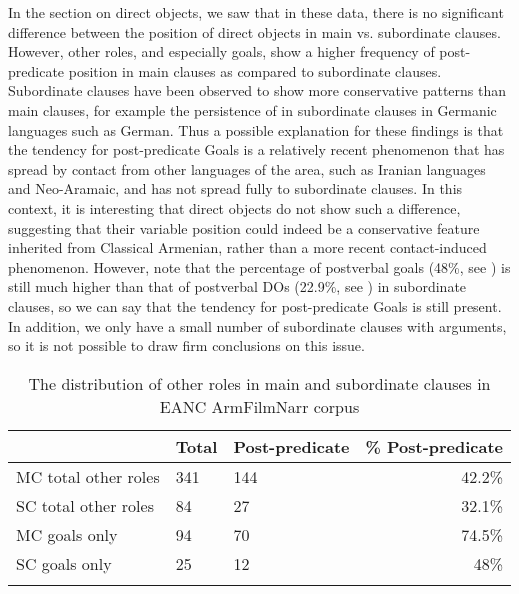 \documentclass[output=paper,colorlinks,citecolor=brown,draftmode]{langscibook}
\begin{document}
 In the section on direct objects, we saw that in these data, there is no significant difference between the position of direct objects in main vs. subordinate clauses. However, other roles, and especially goals, show a higher frequency of post-predicate position in main clauses as compared to subordinate clauses. Subordinate clauses have been observed to show more conservative  patterns than main clauses, for example the persistence of  in subordinate clauses in Germanic languages such as German. Thus a possible explanation for these findings is that the tendency for post-predicate Goals is a relatively recent phenomenon that has spread by contact from other languages of the area, such as Iranian languages and Neo-Aramaic, and has not spread fully to subordinate clauses. In this context, it is interesting that direct objects do not show such a difference, suggesting that their variable position could indeed be a conservative feature inherited from Classical Armenian, rather than a more recent contact-induced phenomenon. However, note that the percentage of postverbal goals (48\%, see ) is still much higher than that of postverbal DOs (22.9\%, see ) in subordinate clauses, so we can say that the tendency for post-predicate Goals is still present. In addition, we only have a small number of subordinate clauses with  arguments, so it is not possible to draw firm conclusions on this issue.
\largerpage
\begin{table}
    \begin{tabularx}{\textwidth}{lYYr}
\lsptoprule
& Total & Post-predicate & \% Post-predicate \\
\midrule
MC total other roles & 341 & 144 & 42.2\% \\
SC total other roles & 84 & 27 & 32.1\% \\
MC goals only & 94 & 70 & 74.5\% \\
SC goals only & 25 & 12 & 48\% \\
\lspbottomrule
    \end{tabularx}
    \caption{The distribution of other roles in main and subordinate clauses in EANC ArmFilmNarr corpus }
    \label{Armenian:tab:23}
\end{table}
\end{document}
